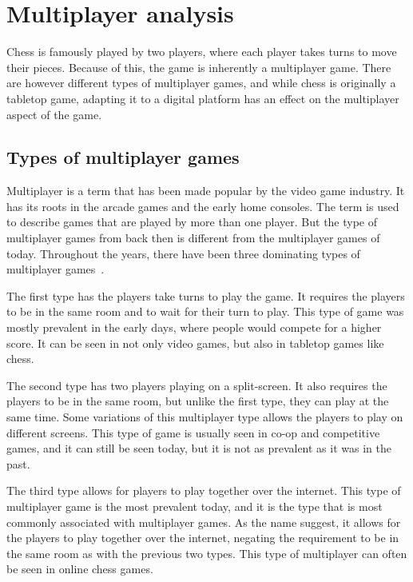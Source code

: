 \section{Multiplayer analysis}\label{sec:multiplayer-analysis}

Chess is famously played by two players, where each player takes turns to move their pieces.
Because of this, the game is inherently a multiplayer game.
There are however different types of multiplayer games, and while chess is originally a tabletop game, adapting it to a 
digital platform has an effect on the multiplayer aspect of the game.

\subsection{Types of multiplayer games}\label{subsec:types-of-multiplayer-games}

Multiplayer is a term that has been made popular by the video game industry.
It has its roots in the arcade games and the early home consoles.
The term is used to describe games that are played by more than one player.
But the type of multiplayer games from back then is different from the multiplayer games of today.
Throughout the years, there have been three dominating types of multiplayer games~\cite{multiplayer-types}.

The first type has the players take turns to play the game.
It requires the players to be in the same room and to wait for their turn to play.
This type of game was mostly prevalent in the early days, where people would compete for a higher score.
It can be seen in not only video games, but also in tabletop games like chess.

The second type has two players playing on a split-screen.
It also requires the players to be in the same room, but unlike the first type, they can play at the same time.
Some variations of this multiplayer type allows the players to play on different screens.
This type of game is usually seen in co-op and competitive games, and it can still be seen today, but it is not as 
prevalent as it was in the past.

The third type allows for players to play together over the internet.
This type of multiplayer game is the most prevalent today, and it is the type that is most commonly associated with
multiplayer games.
As the name suggest, it allows for the players to play together over the internet, negating the requirement to be in the
same room as with the previous two types.
This type of multiplayer can often be seen in online chess games.

